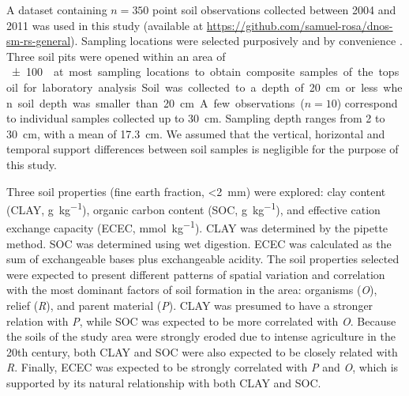A dataset containing $n = 350$ point soil observations collected between \num{2004} and \num{2011} 
\cite{PedronEtAl2006b, SamuelRosaEtAl2011a, MiguelEtAl2012, Samuel-RosaEtAl2013} was used in this study 
(available at \url{https://github.com/samuel-rosa/dnos-sm-rs-general}). Sampling locations were selected 
purposively and by convenience \cite{Samuel-RosaEtAl2014b}. Three soil pits were opened within an area of 
\SI{\pm100}{\m\square} at most sampling locations to obtain composite samples of the topsoil for laboratory 
analysis. Soil was collected to a depth of \SI{20}{\cm} or less when soil depth was smaller than \SI{20}{\cm}. 
A few observations ($n = 10$) correspond to individual samples collected up to \SI{30}{\cm}. Sampling depth 
ranges from \num{2} to \SI{30}{\cm}, with a mean of \SI{17.3}{\cm}. We assumed that the vertical, horizontal 
and temporal support differences between soil samples is negligible for the purpose of this study.

Three soil properties (fine earth fraction, \SI{<2}{\mm}) were explored: clay content (CLAY, 
\si{\gram\per\kilo\gram}), organic carbon content (SOC, \si{\gram\per\kilo\gram}), and effective cation 
exchange capacity (ECEC, \si{\milli\mole\per\kilo\gram}). CLAY was determined by the pipette method. SOC was 
determined using wet digestion. ECEC was calculated as the sum of exchangeable bases plus exchangeable acidity. 
The soil properties selected were expected to present different patterns of spatial variation and correlation 
with the most dominant factors of soil formation \cite{Jenny1941} in the area: organisms (\textit{O}), relief 
(\textit{R}), and parent material (\textit{P}). CLAY was presumed to have a stronger relation with \textit{P}, 
while SOC was expected to be more correlated with \textit{O}. Because the soils of the study area were 
strongly eroded due to intense agriculture in the \num{20}th century, both CLAY and SOC were also expected to 
be closely related with \textit{R}. Finally, ECEC was expected to be strongly correlated with \textit{P} and 
\textit{O}, which is supported by its natural relationship with both CLAY and SOC.

